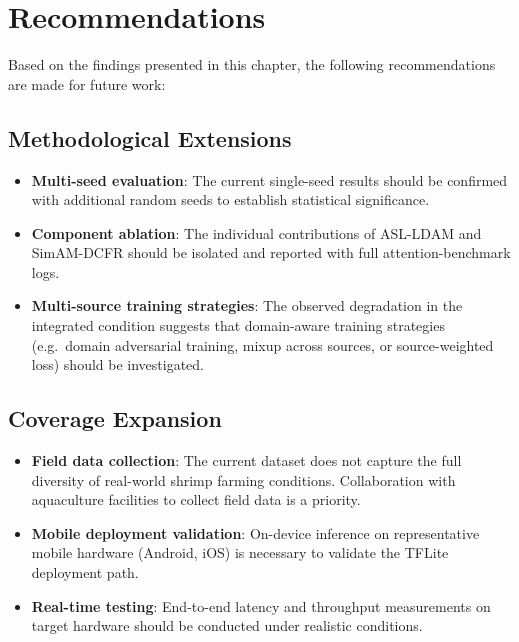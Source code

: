 
\section{Recommendations}
\label{sec:recommendations}

Based on the findings presented in this chapter, the following recommendations are made for future work:

\subsection{Methodological Extensions}
\label{sec:rec-method}

\begin{itemize}
    \item \textbf{Multi-seed evaluation}: The current single-seed results should be confirmed with additional random seeds to establish statistical significance.
    \item \textbf{Component ablation}: The individual contributions of ASL-LDAM and SimAM-DCFR should be isolated and reported with full attention-benchmark logs.
    \item \textbf{Multi-source training strategies}: The observed degradation in the integrated condition suggests that domain-aware training strategies (e.g.~domain adversarial training, mixup across sources, or source-weighted loss) should be investigated.
\end{itemize}

\subsection{Coverage Expansion}
\label{sec:rec-coverage}

\begin{itemize}
    \item \textbf{Field data collection}: The current dataset does not capture the full diversity of real-world shrimp farming conditions. Collaboration with aquaculture facilities to collect field data is a priority.
    \item \textbf{Mobile deployment validation}: On-device inference on representative mobile hardware (Android, iOS) is necessary to validate the TFLite deployment path.
    \item \textbf{Real-time testing}: End-to-end latency and throughput measurements on target hardware should be conducted under realistic conditions.
\end{itemize}

